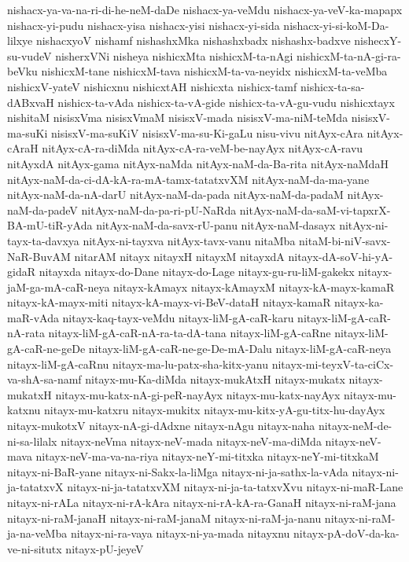 {nishacx-ya-va-na-ri-di-he-neM-daDe
nishacx-ya-veMdu
nishacx-ya-veV-ka-mapapx
nishacx-yi-pudu
nishacx-yisa
nishacx-yisi
nishacx-yi-sida
nishacx-yi-si-koM-Da-lilxye
nishacxyoV
nishamf
nishashxMka
nishashxbadx
nishashx-badxve
nishecxY-su-vudeV
nisherxVNi
nisheya
nishicxMta
nishicxM-ta-nAgi
nishicxM-ta-nA-gi-ra-beVku
nishicxM-tane
nishicxM-tava
nishicxM-ta-va-neyidx
nishicxM-ta-veMba
nishicxV-yateV
nishicxnu
nishicxtAH
nishicxta
nishicx-tamf
nishicx-ta-sa-dABxvaH
nishicx-ta-vAda
nishicx-ta-vA-gide
nishicx-ta-vA-gu-vudu
nishicxtayx
nishitaM
nisisxVma
nisisxVmaM
nisisxV-mada
nisisxV-ma-niM-teMda
nisisxV-ma-suKi
nisisxV-ma-suKiV
nisisxV-ma-su-Ki-gaLu
nisu-vivu
nitAyx-cAra
nitAyx-cAraH
nitAyx-cA-ra-diMda
nitAyx-cA-ra-veM-be-nayAyx
nitAyx-cA-ravu
nitAyxdA
nitAyx-gama
nitAyx-naMda
nitAyx-naM-da-Ba-rita
nitAyx-naMdaH
nitAyx-naM-da-ci-dA-kA-ra-mA-tamx-tatatxvXM
nitAyx-naM-da-ma-yane
nitAyx-naM-da-nA-darU
nitAyx-naM-da-pada
nitAyx-naM-da-padaM
nitAyx-naM-da-padeV
nitAyx-naM-da-pa-ri-pU-NaRda
nitAyx-naM-da-saM-vi-tapxrX-BA-mU-tiR-yAda
nitAyx-naM-da-savx-rU-panu
nitAyx-naM-dasayx
nitAyx-ni-tayx-ta-davxya
nitAyx-ni-tayxva
nitAyx-tavx-vanu
nitaMba
nitaM-bi-niV-savx-NaR-BuvAM
nitarAM
nitayx
nitayxH
nitayxM
nitayxdA
nitayx-dA-soV-hi-yA-gidaR
nitayxda
nitayx-do-Dane
nitayx-do-Lage
nitayx-gu-ru-liM-gakekx
nitayx-jaM-ga-mA-caR-neya
nitayx-kAmayx
nitayx-kAmayxM
nitayx-kA-mayx-kamaR
nitayx-kA-mayx-miti
nitayx-kA-mayx-vi-BeV-dataH
nitayx-kamaR
nitayx-ka-maR-vAda
nitayx-kaq-tayx-veMdu
nitayx-liM-gA-caR-karu
nitayx-liM-gA-caR-nA-rata
nitayx-liM-gA-caR-nA-ra-ta-dA-tana
nitayx-liM-gA-caRne
nitayx-liM-gA-caR-ne-geDe
nitayx-liM-gA-caR-ne-ge-De-mA-Dalu
nitayx-liM-gA-caR-neya
nitayx-liM-gA-caRnu
nitayx-ma-lu-patx-sha-kitx-yanu
nitayx-mi-teyxV-ta-ciCx-va-shA-sa-namf
nitayx-mu-Ka-diMda
nitayx-mukAtxH
nitayx-mukatx
nitayx-mukatxH
nitayx-mu-katx-nA-gi-peR-nayAyx
nitayx-mu-katx-nayAyx
nitayx-mu-katxnu
nitayx-mu-katxru
nitayx-mukitx
nitayx-mu-kitx-yA-gu-titx-hu-dayAyx
nitayx-mukotxV
nitayx-nA-gi-dAdxne
nitayx-nAgu
nitayx-naha
nitayx-neM-de-ni-sa-lilalx
nitayx-neVma
nitayx-neV-mada
nitayx-neV-ma-diMda
nitayx-neV-mava
nitayx-neV-ma-va-na-riya
nitayx-neY-mi-titxka
nitayx-neY-mi-titxkaM
nitayx-ni-BaR-yane
nitayx-ni-Sakx-la-liMga
nitayx-ni-ja-sathx-la-vAda
nitayx-ni-ja-tatatxvX
nitayx-ni-ja-tatatxvXM
nitayx-ni-ja-ta-tatxvXvu
nitayx-ni-maR-Lane
nitayx-ni-rALa
nitayx-ni-rA-kAra
nitayx-ni-rA-kA-ra-GanaH
nitayx-ni-raM-jana
nitayx-ni-raM-janaH
nitayx-ni-raM-janaM
nitayx-ni-raM-ja-nanu
nitayx-ni-raM-ja-na-veMba
nitayx-ni-ra-vaya
nitayx-ni-ya-mada
nitayxnu
nitayx-pA-doV-da-ka-ve-ni-situtx
nitayx-pU-jeyeV
}
